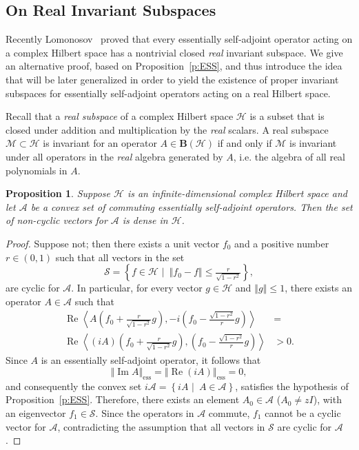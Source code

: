 \documentclass{tran-l}
\newtheorem{prop}[thm]{Proposition}
\theoremstyle{definition}
\theoremstyle{remark}
\numberwithin{equation}{subsection}
\DeclareMathOperator{\RE}{Re}
\DeclareMathOperator{\IM}{Im}
\DeclareMathOperator{\ess}{ess}
\newcommand{\h}{\mathcal{H}}
\newcommand{\s}{\mathcal{S}}
\newcommand{\A}{\mathcal{A}}
\newcommand{\M}{\mathcal{M}}
\newcommand{\BH}{\mathbf{B}(\mathcal{H})}
\newcommand{\set}[1]{\left\{#1\right\}}
\newcommand{\seq}[1]{\left<#1\right>}
\newcommand{\norm}[1]{\left\Vert#1\right\Vert}
\newcommand{\essnorm}[1]{\norm{#1}_{\ess}}
\begin{document}

\subsection{On Real Invariant Subspaces}
Recently Lomonosov~\cite{Lom92} proved that every essentially self-adjoint operator acting on a complex Hilbert space has a nontrivial closed \emph{real} invariant subspace. We give an alternative proof, based on Proposition~\ref{p:ESS}, and thus introduce the idea that will be later generalized in order to yield the existence of proper invariant subspaces for essentially self-adjoint operators acting on a real Hilbert space.

Recall that a \emph{real subspace} of a complex Hilbert space $\h$ is a subset that is closed under addition and multiplication by the \emph{real} scalars. A real subspace $\M\subset\h$ is invariant for an operator $A\in\BH$ if and only if $\M$ is invariant under all operators in the \emph{real} algebra generated by $A$, i.e. the algebra of all real polynomials in $A$.

\begin{prop}\label{p:RIS}
Suppose $\h$ is an infinite-dimensional complex Hilbert space and let $\A$ be a convex set of commuting essentially self-adjoint operators. Then the set of non-cyclic vectors for $\A$ is dense in $\h$.
\end{prop}

\begin{proof}
Suppose not; then there exists a unit vector $f_0$ and a positive number $r\in(0,1)$ such that all vectors in the set
\[ \s=\set{f\in\h\,\,|\,\,\,\norm{f_0-f} \leq
      \tfrac{r}{\sqrt{1-r^2}}}, \]
are cyclic for $\A$. In particular, for every vector $g\in\h$ and $\norm{g}\leq1$, there exists an operator $A\in\A$ such that
\begin{align*}
  \RE\seq{A\left(f_0+\tfrac{r}{\sqrt{1-r^2}}g\right),
    -i\left(f_0-\tfrac{\sqrt{1-r^2}}{r}g\right)} & = \\
  \RE\seq{(i{A})\left(f_0+\tfrac{r}{\sqrt{1-r^2}}g\right),
    \left(f_0-\tfrac{\sqrt{1-r^2}}{r}g\right)} & > 0.
\end{align*}
Since $A$ is an essentially self-adjoint operator, it follows that
\[ \essnorm{\IM{A}}=\essnorm{\RE(i{A})}=0, \]
and consequently the convex set $i\A=\set{i{A}\,\,|\,\,\,A\in\A}$, satisfies the hypothesis of Proposition~\ref{p:ESS}. Therefore, there exists an element $A_0\in\A$ ($A_0\neq{z}I$), with an eigenvector $f_1\in\s$. Since the operators in $\A$ commute, $f_1$ cannot be a cyclic vector for $\A$, contradicting the assumption that all vectors in $\s$ are cyclic for $\A$.
\end{proof}
\end{document}

